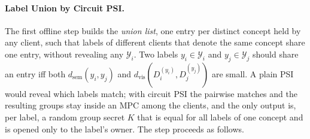 \paragraph{Label Union by Circuit PSI.}
The first offline step builds the \emph{union list}, one entry per distinct concept held by any
client, such that labels of different clients that denote the same concept share one entry, without
revealing any $\mathcal{Y}_i$. Two labels $y_i\in\mathcal{Y}_i$ and $y_j\in\mathcal{Y}_j$ should
share an entry iff both $d_{\mathrm{sem}}(y_i,y_j)$ and $d_{\mathrm{vis}}(D_i^{(y_i)},D_j^{(y_j)})$
are small. A plain PSI would reveal which labels match; with circuit PSI the pairwise matches and the
resulting groups stay inside an MPC among the clients, and the only output is, per label, a random
group secret $K$ that is equal for all labels of one concept and is opened only to the label's owner.
The step proceeds as follows.

